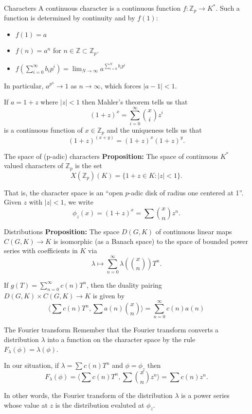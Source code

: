 \documentclass[
  ignorenonframetext,
]{beamer}
\providecommand{\tightlist}{%
  \setlength{\itemsep}{0pt}\setlength{\parskip}{0pt}}
\begin{document}
\begin{frame}{Characters}
\protect\hypertarget{characters}{}
A continuous character is a continuous function
\(f:\mathbb{Z}_p\to K^{*}\). Such a function is determined by continuity
and by \(f(1)\):

\begin{itemize}
\tightlist
\item
  \(f(1)=a\)
\item
  \(f(n)=a^n\) for \(n\in\mathbb{Z}\subset\mathbb{Z}_p\).
\item
  \(f(\sum_{i=0}^{\infty} b_i p^i)=\lim_{N\to\infty} a^{\sum_{i=0}^{N} b_i p^i}\)
\end{itemize}

In particular, \(a^{p^{n}}\to 1\) as \(n\to\infty\), which forces
\(|a-1|<1\).

If \(a=1+z\) where \(|z|<1\) then Mahler's theorem tells us that \[
(1+z)^x=\sum_{i=0}^{\infty} \binom{x}{i}z^{i}
\] is a continuous function of \(x\in\mathbb{Z}_p\) and the uniqueness
tells us that \[
(1+z)^{(x+y)}=(1+z)^x(1+z)^y.
\]
\end{frame}

\begin{frame}{The space of (p-adic) characters}
\protect\hypertarget{the-space-of-p-adic-characters}{}
\textbf{Proposition:} The space of continuous \(K^{*}\) valued
characters of \(\mathbb{Z}_p\) is the set \[
X(\mathbb{Z}_p)(K)=\{1+z\in K: |z|<1\}.
\]

That is, the character space is an ``open \(p\)-adic disk of radius one
centered at 1''. Given \(z\) with \(|z|<1\), we write \[
\phi_z(x)=(1+z)^x=\sum \binom{x}{n}z^n.
\]
\end{frame}

\begin{frame}{Distributions}
\protect\hypertarget{distributions-1}{}
\textbf{Proposition:} The space \(D(G,K)\) of continuous linear maps
\(C(G,K)\to K\) is isomorphic (as a Banach space) to the space of
bounded power series with coefficients in \(K\) via \[
\lambda \mapsto \sum_{n=0}^{\infty} \lambda(\binom{x}{n})T^{n}.
\]

If \(g(T)=\sum_{n=0}^{\infty} c(n)T^{n}\), then the duality pairing
\(D(G,K)\times C(G,K)\to K\) is given by \[
\langle \sum c(n)T^n,\sum a(n)\binom{x}{n}\rangle =\sum_{n=0}^{\infty} c(n)a(n)
\]
\end{frame}

\begin{frame}{The Fourier transform}
\protect\hypertarget{the-fourier-transform}{}
Remember that the Fourier transform converts a distribution \(\lambda\)
into a function on the character space by the rule
\(F_{\lambda}(\phi) = \lambda(\phi)\).

In our situation, if \(\lambda=\sum c(n)T^{n}\) and \(\phi=\phi_z\) then
\[
F_{\lambda}(\phi) = \langle \sum c(n)T^n, \sum \binom{x}{n}z^n\rangle = \sum c(n)z^n.
\]

In other words, the Fourier transform of the distribution \(\lambda\) is
a power series whose value at \(z\) is the distribution evaluted at
\(\phi_z\).
\end{frame}
\end{document}
